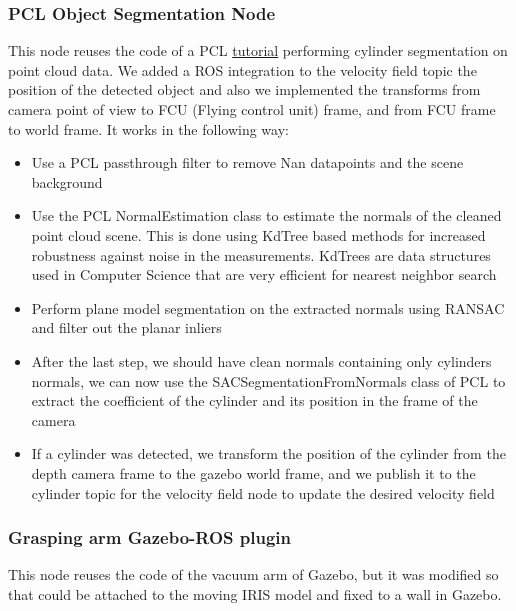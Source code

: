 \subsubsection{PCL Object Segmentation Node}
This node reuses the code of a PCL \href{https://pcl.readthedocs.io/projects/tutorials/en/master/cylinder_segmentation.html}{tutorial} performing cylinder segmentation on point cloud data. 
We added a ROS integration to the velocity field topic the position of the detected object and also we implemented the transforms from camera point of view to FCU (Flying control unit) frame, and from FCU frame to world frame. 
It works in the following way:
\begin{itemize}
    \item Use a PCL passthrough filter to remove Nan datapoints and the scene background
    \item Use the PCL NormalEstimation class to estimate the normals of the cleaned point cloud scene. This is done using KdTree based methods for increased robustness against noise in the measurements. KdTrees are data structures used in Computer Science that are very efficient for nearest neighbor search
    \item Perform plane model segmentation on the extracted normals using RANSAC and filter out the planar inliers
    \item After the last step, we should have clean normals containing only cylinders normals, we can now use the SACSegmentationFromNormals class of PCL to extract the coefficient of the cylinder and its position in the frame of the camera
    \item If a cylinder was detected, we transform the position of the cylinder from the depth camera frame to the gazebo world frame, and we publish it to the cylinder topic for the velocity field node to update the desired velocity field
\end{itemize}
\subsubsection{Grasping arm Gazebo-ROS plugin}    
This node reuses the code of the vacuum arm of Gazebo, but it was modified so that could be attached to the moving IRIS model and fixed to a wall in Gazebo. 

